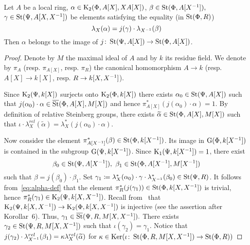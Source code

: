 \begin{lemma} \label{lem:horrocks--ingredient}
Let $A$ be a local ring, $\alpha \in \operatorname{K}_2(\Phi, A[X], XA[X])$, $\beta \in \operatorname{St}(\Phi, A[X^{-1}]),$ $\gamma \in \operatorname{St}(\Psi, A[X, X^{-1}])$ be elements satisfying the equality (in $\operatorname{St}(\Phi, R)$)
\begin{equation} \label{eq:alpha-def}\lambda_X(\alpha) = j(\gamma) \cdot \lambda_{X^{-1}}(\beta) \end{equation}
Then $\alpha$ belongs to the image of $j\colon \operatorname{St}(\Psi, A[X]) \to \operatorname{St}(\Phi, A[X])$.
\end{lemma}
\begin{proof}
    Denote by $M$ the maximal ideal of $A$ and by $k$ its residue field.
    We denote by $\pi_A$ (resp. $\pi_{A[X]}$, resp. $\pi_{R}$) the canonical homomorphism $A \to k$ (resp. $A[X] \to k[X]$, resp. $R \to k[X, X^{-1}]$).

    Since $\operatorname{K}_2(\Psi, k[X])$ surjects onto $\operatorname{K}_2(\Phi, k[X])$ there exists $\alpha_0 \in \operatorname{St}(\Psi, A[X])$ such that $j(\alpha_0) \cdot \alpha \in \overline{\operatorname{St}}(\Phi, A[X], M[X])$ and
    hence $\pi_{A[X]}^*(j(\alpha_0) \cdot \alpha) = 1$.
    By definition of relative Steinberg groups, there exists $\widetilde{\alpha} \in \operatorname{St}(\Phi, A[X], M[X])$ such that
    $\iota \cdot \lambda_X^{rel}(\widetilde{\alpha}) = \lambda_X^* (j(\alpha_0) \cdot \alpha)$. %

    Now consider the element $\pi^*_{A[X^{-1}]}(\beta) \in \operatorname{St}(\Phi, k[X^{-1}])$.
    Its image in $\operatorname{G}(\Phi, k[X^{-1}])$ is contained in the subgroup $\operatorname{G}(\Psi, k[X^{-1}])$.
    Since $\operatorname{K}_1(\Psi, k[X^{-1}]) = 1$, there exist
    \[\beta_0 \in \operatorname{St}(\Psi, A[X^{-1}]),\ \beta_1 \in \operatorname{St}(\Phi, A[X^{-1}], M[X^{-1}])\] such that $\beta = j(\beta_0) \cdot \beta_1$.
    Set $\gamma_1 \coloneqq \lambda^*_X(\alpha_0) \cdot \gamma \cdot \lambda^*_{X^{-1}}(\beta_0) \in \operatorname{St}(\Psi, R)$.
    It follows from~\eqref{eq:alpha-def} that the element $\pi_R^*(j(\gamma_1)) \in \operatorname{St}(\Phi, k[X, X^{-1}])$ is trivial, hence $\pi^*_R(\gamma_1) \in \operatorname{K}_2(\Psi, k[X, X^{-1}])$.
    Recall from~\cite{Hur77} that $\operatorname{K}_2(\Psi, k[X, X^{-1}]) \to \operatorname{K}_2(\Phi, k[X, X^{-1}])$ is injective (see the assertion after Korollar~6).
    Thus, $\gamma_1 \in \overline{\operatorname{St}}(\Psi, R, M[X, X^{-1}]).$
    There exists $\gamma_2 \in \operatorname{St}(\Psi, R, M[X, X^{-1}])$ such that $\iota (\gamma_2) = \gamma_1$.
    Notice that $j(\gamma_2) \cdot \lambda_{X^{-1}}^{rel}(\beta_1) = \kappa \lambda_X^{rel}(\widetilde{\alpha})$ for $\kappa \in \operatorname{Ker}(\iota\colon \operatorname{St}(\Phi, R, M[X, X^{-1}]) \to \operatorname{St}(\Phi, R))$


\end{proof}
